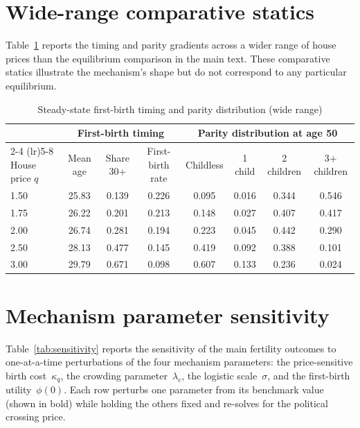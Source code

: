 \documentclass[11pt]{article}
\begin{document}
\section{Wide-range comparative statics}

Table~\ref{tab:timing_wide} reports the timing and parity gradients across a wider range of
house prices than the equilibrium comparison in the main text. These comparative statics
illustrate the mechanism's shape but do not correspond to any particular equilibrium.

\begin{table}[htbp]
\centering
\caption{Steady-state first-birth timing and parity distribution (wide range)}
\label{tab:timing_wide}
\small
\begin{tabular}{l ccc cccc}
\toprule
 & \multicolumn{3}{c}{First-birth timing} & \multicolumn{4}{c}{Parity distribution at age 50} \\
\cmidrule(lr){2-4} \cmidrule(lr){5-8}
House price $q$ & Mean age & Share 30+ & First-birth rate & Childless & 1 child & 2 children & 3+ children \\
\midrule
1.50 & 25.83 & 0.139 & 0.226 & 0.095 & 0.016 & 0.344 & 0.546 \\
1.75 & 26.22 & 0.201 & 0.213 & 0.148 & 0.027 & 0.407 & 0.417 \\
2.00 & 26.74 & 0.281 & 0.194 & 0.223 & 0.045 & 0.442 & 0.290 \\
2.50 & 28.13 & 0.477 & 0.145 & 0.419 & 0.092 & 0.388 & 0.101 \\
3.00 & 29.79 & 0.671 & 0.098 & 0.607 & 0.133 & 0.236 & 0.024 \\
\bottomrule
\end{tabular}
\end{table}

\section{Mechanism parameter sensitivity}
\label{app:sensitivity}

Table~\ref{tab:sensitivity} reports the sensitivity of the main fertility outcomes to
one-at-a-time perturbations of the four mechanism parameters: the price-sensitive birth
cost~$\kappa_q$, the crowding parameter~$\lambda_c$, the logistic scale~$\sigma$, and the
first-birth utility~$\phi(0)$. Each row perturbs one parameter from its benchmark value
(shown in bold) while holding the others fixed and re-solves for the political crossing price.
\end{document}
